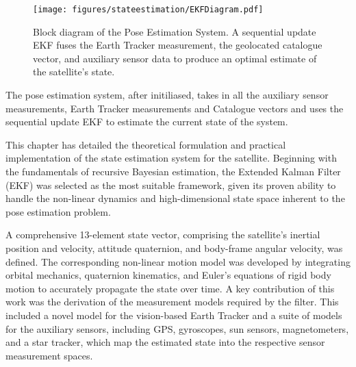 
\begin{figure}[H]
    \centering
    \texttt{[image: figures/stateestimation/EKFDiagram.pdf]}
    \caption{Block diagram of the Pose Estimation System. A sequential update EKF fuses the Earth Tracker measurement, the geolocated catalogue vector, and auxiliary 
    sensor data to produce an optimal estimate of the satellite's state.}
    \label{fig:EKFDiagram}
\end{figure}

\noindent
The pose estimation system, after initiliased, takes in all the auxiliary sensor measurements, Earth Tracker measurements and Catalogue vectors and uses the sequential update EKF 
to estimate the current state of the system.

\label{sec:stateconclusion}

This chapter has detailed the theoretical formulation and practical implementation of the state estimation system for the satellite. Beginning with the fundamentals of recursive Bayesian estimation, 
the Extended Kalman Filter (EKF) was selected as the most suitable framework, given its proven ability to handle the non-linear dynamics and high-dimensional state space inherent to the pose estimation problem.
\vspace{0.5cm}

\noindent
A comprehensive 13-element state vector, comprising the satellite's inertial position and velocity, attitude quaternion, and body-frame angular velocity, was defined. The corresponding non-linear 
motion model was developed by integrating orbital mechanics, quaternion kinematics, and Euler's equations of rigid body motion to accurately propagate the state over time. A key contribution of this 
work was the derivation of the measurement models required by the filter. This included a novel model for the vision-based Earth Tracker and a suite of models for the auxiliary sensors, including GPS, 
gyroscopes, sun sensors, magnetometers, and a star tracker, which map the estimated state into the respective sensor measurement spaces.
\vspace{0.5cm}


